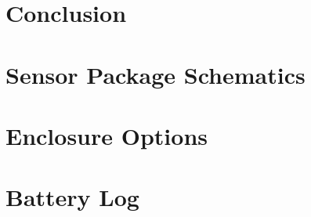 \documentclass[12pt]{report}
\begin{document}
\chapter{Conclusion}
\label{ch:Collection}
	
	



\appendix

\chapter{Sensor Package Schematics}
\label{app:Schematic}


\chapter{Enclosure Options}
\label{app:CaseOptions}


\chapter{Battery Log}
\label{app:batterylog}

 
\end{document}
